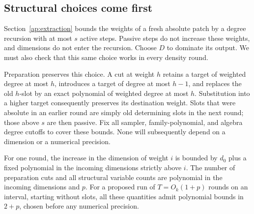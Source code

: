\subsection{Structural choices come first}

Section~\ref{ap:extraction} bounds the weights of a fresh absolute patch
by a degree recursion with at most $s$ active steps.  Passive steps do not
increase these weights, and dimensions do not enter the recursion.  Choose
$D$ to dominate its output.  We must also check that this same choice
works in every density round.

Preparation preserves this choice.  A cut at weight $h$ retains a target
of weighted degree at most $h$, introduces a target of degree at most
$h-1$, and replaces the old $h$-slot by an exact polynomial of weighted
degree at most $h$.  Substitution into a higher target consequently preserves
its destination weight.  Slots that were absolute in an earlier round are
simply old determining slots in the next round; those above $s$ are then
passive.  Fix all sampler, family-polynomial, and algebra degree cutoffs
to cover these bounds.  None will subsequently depend on a dimension or
a numerical precision.

\begin{proposition}
\label{ap:iteration:dimensions}
For one round, the increase in the dimension of weight $i$ is bounded by
$d_0$ plus a fixed polynomial in the incoming dimensions strictly above
$i$.  The number of preparation cuts and all structural variable counts
are polynomial in the incoming dimensions and $p$.
For a proposed run of $T=O_k(1+p)$ rounds on an interval, starting without
slots, all these quantities admit polynomial bounds in $2+p$, chosen
before any numerical precision.
\end{proposition}

